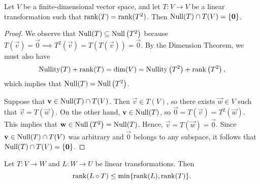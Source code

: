 \documentclass{homework}
\begin{document}
	\maketitle
	
	\question Let $V$ be a finite-dimensional vector space, and let $T :V\to V$ be a linear transformation such that $\mathrm{rank}(T) = \mathrm{rank}(T^2)$. Then $\mathrm{Null}(T) \cap T(V) = \{\mathbf{0}\}$.
	
	\begin{proof}
		We observe that $\mathrm{Null}(T) \subseteq \mathrm{Null}\left(T^2\right)$ because $T(\vec{v}) = \vec{0} \implies T^2(\vec{v}) = T(T(\vec{v})) = \vec{0}.$ By the Dimension Theorem, we must also have
		\begin{equation*}
			\mathrm{Nullity}(T) + \mathrm{rank}(T) = \dim(V) = \mathrm{Nullity}\left(T^2\right) + \mathrm{rank}\left(T^2\right),
		\end{equation*}
		which implies that $\mathrm{Null}(T) = \mathrm{Null}\left(T^2\right)$.
		
		Suppose that $\mathbf{v} \in \mathrm{Null}(T) \cap T(V)$. Then $\vec{v} \in T(V)$, so there exists $\vec{w} \in V$ such that $\vec{v} = T(\vec{w})$. On the other hand, $\mathbf{v} \in \mathrm{Null}(T)$, so $\vec{0} = T(\vec{v}) = T^2(\vec{w})$. This implies that $\mathbf{w} \in \mathrm{Null}\left(T^2\right) = \mathrm{Null}(T)$. Hence, $\vec{v} = T(\vec{w}) = \vec{0}$. Since $\mathbf{v} \in \mathrm{Null}(T)\cap T(V)$ was arbitrary and $\vec{0}$ belongs to any subspace, it follows that $\mathrm{Null}(T) \cap T(V) = \{\mathbf{0}\}$.
	\end{proof}
	
	\question Let $T : V \to W$ and $L : W \to U$ be linear transformations. Then
	\begin{equation*}
		\mathrm{rank}(L \circ T) \le \min\{\mathrm{rank}(L), \mathrm{rank}(T)\}.
	\end{equation*}
	
\end{document}
